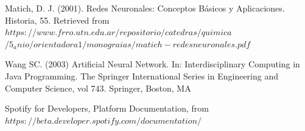 \documentclass[conference]{IEEEtran}
\begin{document}
\begin{thebibliography}{1}

Matich, D. J. (2001). Redes Neuronales: Conceptos Básicos y Aplicaciones. Historia, 55. Retrieved from \\
\emph{$https://www.frro.utn.edu.ar/repositorio/catedras/quimica$
$/5 _ anio/orientadora1/monograias/matich-redesneuronales.pdf$}

Wang SC. (2003) Artificial Neural Network. In: Interdisciplinary Computing in Java Programming. The Springer International Series in Engineering and Computer Science, vol 743. Springer, Boston, MA


Spotify for Developers, Platform Documentation, from
{$https://beta.developer.spotify.com/documentation/$}

\end{thebibliography}
\end{document}
